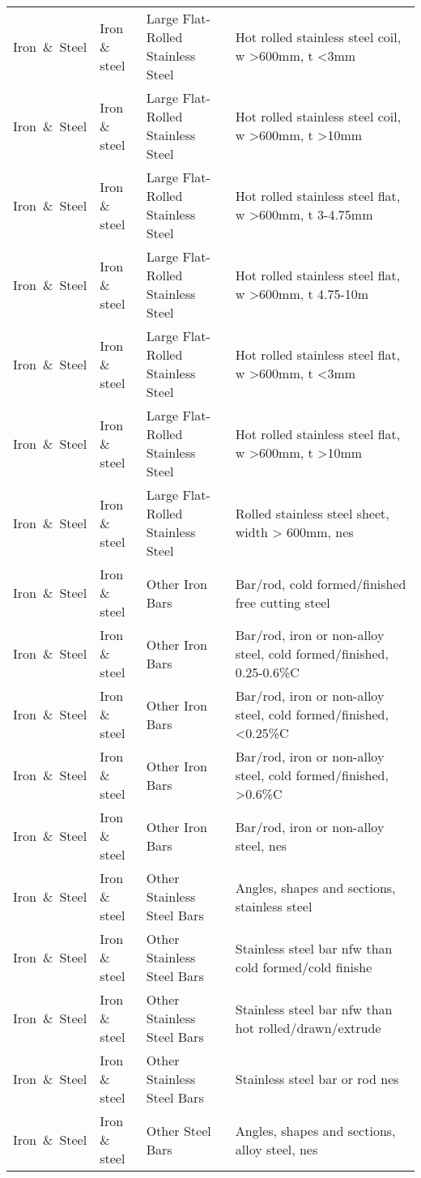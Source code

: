 \begin{appendices}
\begin{xltabular}{\textwidth}{|p{0.07\textwidth}|p{0.12\textwidth}|p{0.20\textwidth}|p{0.5\textwidth}|}
Iron\ \&\ Steel & Iron \& steel & Large Flat-Rolled Stainless Steel & Hot rolled stainless steel coil, w >600mm, t <3mm \\
Iron\ \&\ Steel & Iron \& steel & Large Flat-Rolled Stainless Steel & Hot rolled stainless steel coil, w >600mm, t >10mm \\
Iron\ \&\ Steel & Iron \& steel & Large Flat-Rolled Stainless Steel & Hot rolled stainless steel flat, w >600mm, t 3-4.75mm \\
Iron\ \&\ Steel & Iron \& steel & Large Flat-Rolled Stainless Steel & Hot rolled stainless steel flat, w >600mm, t 4.75-10m \\
Iron\ \&\ Steel & Iron \& steel & Large Flat-Rolled Stainless Steel & Hot rolled stainless steel flat, w >600mm, t <3mm \\
Iron\ \&\ Steel & Iron \& steel & Large Flat-Rolled Stainless Steel & Hot rolled stainless steel flat, w >600mm, t >10mm \\
Iron\ \&\ Steel & Iron \& steel & Large Flat-Rolled Stainless Steel & Rolled stainless steel sheet, width > 600mm, nes \\
Iron\ \&\ Steel & Iron \& steel & Other Iron Bars & Bar/rod, cold formed/finished free cutting steel \\
Iron\ \&\ Steel & Iron \& steel & Other Iron Bars & Bar/rod, iron or non-alloy steel, cold formed/finished, 0.25-0.6\%C \\
Iron\ \&\ Steel & Iron \& steel & Other Iron Bars & Bar/rod, iron or non-alloy steel, cold formed/finished, <0.25\%C \\
Iron\ \&\ Steel & Iron \& steel & Other Iron Bars & Bar/rod, iron or non-alloy steel, cold formed/finished, >0.6\%C \\
Iron\ \&\ Steel & Iron \& steel & Other Iron Bars & Bar/rod, iron or non-alloy steel, nes \\
Iron\ \&\ Steel & Iron \& steel & Other Stainless Steel Bars & Angles, shapes and sections, stainless steel \\
Iron\ \&\ Steel & Iron \& steel & Other Stainless Steel Bars & Stainless steel bar nfw than cold formed/cold finishe \\
Iron\ \&\ Steel & Iron \& steel & Other Stainless Steel Bars & Stainless steel bar nfw than hot rolled/drawn/extrude \\
Iron\ \&\ Steel & Iron \& steel & Other Stainless Steel Bars & Stainless steel bar or rod nes \\
Iron\ \&\ Steel & Iron \& steel & Other Steel Bars & Angles, shapes and sections, alloy steel, nes \\

\end{xltabular}
\end{appendices}
